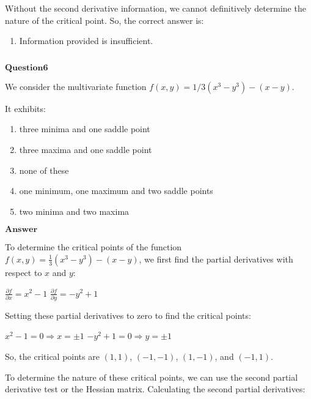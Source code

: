 \documentclass[11pt]{article}
\makeatletter
\providecommand{\tightlist}{%
      \setlength{\itemsep}{0pt}\setlength{\parskip}{0pt}}
\newcommand{\boxspacing}{\kern\kvtcb@left@rule\kern\kvtcb@boxsep}
\newcommand{\prompt}[4]{
        {\ttfamily\llap{{\color{#2}[#3]:\hspace{3pt}#4}}\vspace{-\baselineskip}}
    }
\makeatother
\begin{document}
Without the second derivative information, we cannot definitively
determine the nature of the critical point. So, the correct answer is:

\begin{enumerate}
\def\labelenumi{\alph{enumi}.}
\setcounter{enumi}{3}
\tightlist
\item
  Information provided is insufficient.
\end{enumerate}

    \begin{tcolorbox}[breakable, size=fbox, boxrule=1pt, pad at break*=1mm,colback=cellbackground, colframe=cellborder]
\prompt{In}{incolor}{ }{\boxspacing}
\begin{Verbatim}[commandchars=\\\{\}]

\end{Verbatim}
\end{tcolorbox}

    $\textbf{Question6}$

We consider the multivariate function $f(x,y)=1/3(x^3-y^3)-(x-y)$.

It exhibits:

\begin{enumerate}
\def\labelenumi{\alph{enumi}.}
\item
  three minima and one saddle point
\item
  three maxima and one saddle point
\item
  none of these
\item
  one minimum, one maximum and two saddle points
\item
  two minima and two maxima
\end{enumerate}

$\textbf{Answer}$

    To determine the critical points of the function $ f(x, y) =
\frac{1}{3}(x^3 - y^3) - (x - y) $, we first find the partial
derivatives with respect to $ x $ and $ y $:

$ \frac{\partial f}{\partial x} = x^2 - 1 $ $
\frac{\partial f}{\partial y} = -y^2 + 1 $

Setting these partial derivatives to zero to find the critical points:

$ x^2 - 1 = 0 \Rightarrow x = \pm 1 $ $ -y^2 + 1 = 0
\Rightarrow y = \pm 1 $

So, the critical points are $ (1, 1) $, $ (-1, -1) $, $ (1, -1) $,
and $ (-1, 1) $.

To determine the nature of these critical points, we can use the second
partial derivative test or the Hessian matrix. Calculating the second
partial derivatives:
\end{document}

